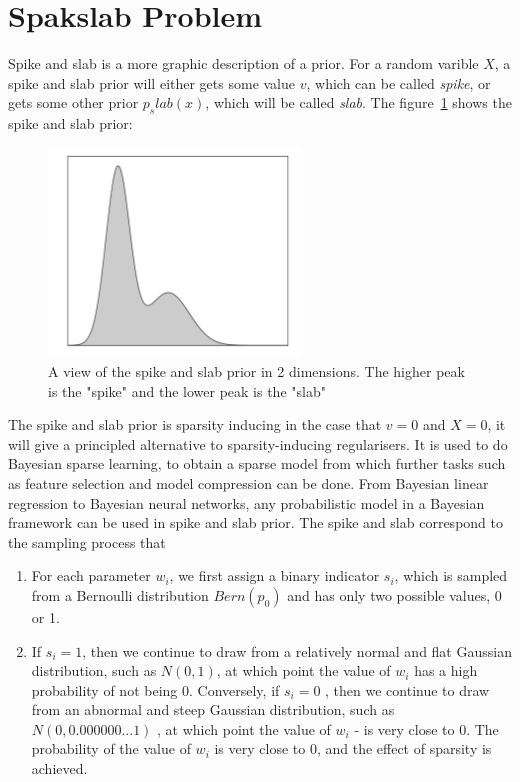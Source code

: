 \documentclass[11pt]{book}
\begin{document}
\section{Spakslab Problem}
Spike and slab is a more graphic description of a prior.
For a random varible $X$, a spike and slab prior will either gets some value $v$, which can
be called \textit{spike}, or gets some other prior $p_slab(x)$, which will be called \textit{slab}.
The figure~\ref{fig:spike-slab} shows the spike and slab prior:
\begin{center}
	\begin{figure}[h]
			\centering
			\includegraphics[width=0.6\textwidth]{spike-slab}
			\caption{A view of the spike and slab prior in 2 dimensions. The higher peak is the "spike" and the lower peak is the "slab"}
			\label{fig:spike-slab}
	\end{figure}
	\end{center} 
The spike and slab prior is sparsity inducing in the case that $v=0$ and $X = 0$,
it will give a principled alternative to sparsity-inducing regularisers.
It is used to do Bayesian sparse learning, 
to obtain a sparse model from which further tasks such as feature selection and model compression can be done.
From Bayesian linear regression to Bayesian neural networks, any probabilistic model in a Bayesian framework can be used in spike and slab prior.
The spike and slab correspond to the sampling process that
\begin{enumerate}
	\item For each parameter $w_i$, we first assign a binary indicator $s_i$, which is sampled from a Bernoulli distribution $Bern(p_0)$ and has only two possible values, 0 or 1.
 \item If $s_i=1$, then we continue to draw from a relatively normal and flat Gaussian distribution, such as $N(0,1)$,  at which point the value of $w_i$ has a high probability of not being 0. 
 Conversely, if $s_i=0$ , then we continue to draw from an abnormal and steep Gaussian distribution, such as $N(0,0.000000...1)$ , at which point the value of $w_i$ - is very close to 0.
The probability of the value of $w_i$ is very close to 0, and the effect of sparsity is achieved. 
\end{enumerate}
\end{document}
